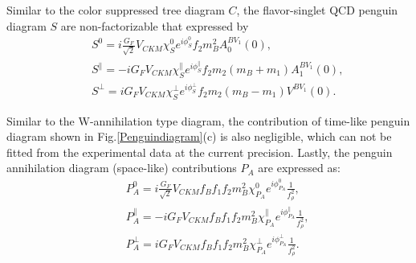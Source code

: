 \documentclass[11pt]{article}
\begin{document}
Similar to the color suppressed tree diagram $C$, the flavor-singlet QCD penguin diagram $S$ are non-factorizable that expressed  by
\begin{eqnarray}
&&{ S}^0=i\frac{G_F}{\sqrt 2}V_{CKM}\chi_{S}^0e^{i \phi^0_{S}}f_2m_B^2A_0^{BV_1}(0), \\
&&{ S}^\parallel=-iG_FV_{CKM}\chi_{S}^\parallel e^{i \phi^\parallel_{S}}f_2m_2 \left(m_B+m_1\right) A_1^{BV_1}(0),  \\
&&{ S}^\perp=iG_FV_{CKM}\chi_{S}^\perp e^{i \phi^\perp_{S}}f_2m_2\left(m_B-m_1\right)V^{BV_1}(0).
\end{eqnarray}

Similar to the W-annihilation type diagram, the contribution of time-like penguin diagram shown in Fig.\ref{Penguindiagram}(c) is also negligible, which can not be fitted from the experimental data at the current precision. Lastly, the penguin  annihilation diagram (space-like) contributions $P_A$ are   expressed as:
\begin{eqnarray}
&&P_A^0=i\frac{G_F}{\sqrt 2}V_{CKM}f_Bf_1f_2m_B^2\chi_{P_A}^0e^{i \phi^0_{P_A}}\frac{1}{f_\rho^2},\\
&&P_A^\parallel=-iG_FV_{CKM}f_Bf_1f_2m_B^2\chi_{P_A}^\parallel e^{i \phi^\parallel_{P_A}}\frac{1}{f_\rho^2},\\
&&P_A^\perp=iG_FV_{CKM}f_Bf_1f_2m_B^2\chi_{P_A}^\perp e^{i \phi^\perp_{P_A}}\frac{1}{f_\rho^2}.\label{PAE}
\end{eqnarray}
\end{document}
